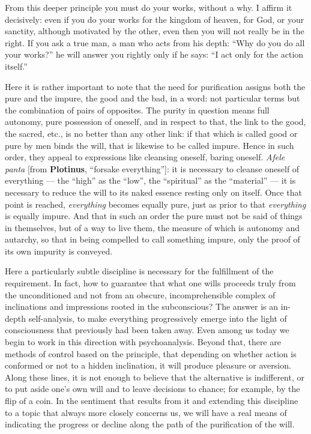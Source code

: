 \begin{quotex}
From this deeper principle you must do your works, without a why. I affirm it decisively: even if you do your works for the kingdom of heaven, for God, or your sanctity, although motivated by the other, even then you will not really be in the right. If you ask a true man, a man who acts from his depth: “Why do you do all your works?” he will answer you rightly only if he says: “I act only for the action itself.” 

\end{quotex}
Here it is rather important to note that the need for purification assigns both the pure and the impure, the good and the bad, in a word: not particular terms but the combination of pairs of opposites. The purity in question means full autonomy, pure possession of oneself, and in respect to that, the link to the good, the sacred, etc., is no better than any other link: if that which is called good or pure by men binds the will, that is likewise to be called impure. Hence in such order, they appeal to expressions like cleansing oneself, baring oneself. \textit{Afele panta} [from \textbf{Plotinus}, “forsake everything”]: it is necessary to cleanse oneself of everything — the “high” as the “low”, the “spiritual” as the “material” — it is necessary to reduce the will to its naked essence resting only on itself. Once that point is reached, \textit{everything} becomes equally pure, just as prior to that \textit{everything} is equally impure. And that in such an order the pure must not be said of things in themselves, but of a way to live them, the measure of which is autonomy and autarchy, so that in being compelled to call something impure, only the proof of its own impurity is conveyed.

Here a particularly subtle discipline is necessary for the fulfillment of the requirement. In fact, how to guarantee that what one wills proceeds truly from the unconditioned and not from an obscure, incomprehensible complex of inclinations and impressions rooted in the subconscious? The answer is an in-depth self-analysis, to make everything progressively emerge into the light of consciousness that previously had been taken away. Even among us today we begin to work in this direction with psychoanalysis. Beyond that, there are methods of control based on the principle, that depending on whether action is conformed or not to a hidden inclination, it will produce pleasure or aversion. Along these lines, it is not enough to believe that the alternative is indifferent, or to put aside one's own will and to leave decisions to chance; for example, by the flip of a coin. In the sentiment that results from it and extending this discipline to a topic that always more closely concerns us, we will have a real means of indicating the progress or decline along the path of the purification of the will.

